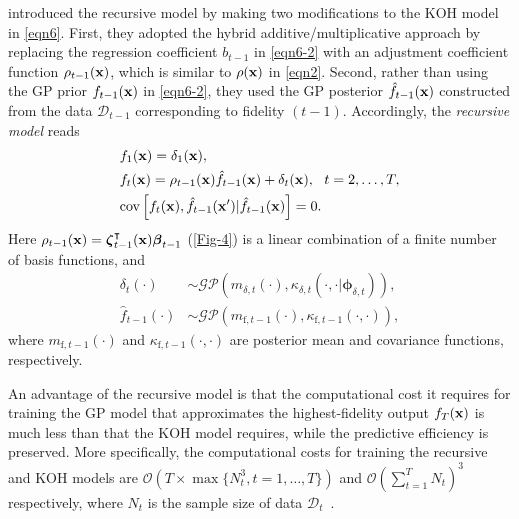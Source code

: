 \documentclass[journal ]{new-aiaa}
\begin{document}
	\citet{Gratiet2014} introduced the recursive model by making two modifications to the KOH model in \cref{eqn6}.
	First, they adopted the hybrid additive/multiplicative approach by replacing the regression coefficient $b_{t-1}$ in \cref{eqn6-2} with an adjustment coefficient function $\rho_{t-1}({\bf x})$, which is similar to $\rho({\bf x})$ in \cref{eqn2}.
	Second, rather than using the GP prior $f_{t-1}({\bf x})$ in \cref{eqn6-2}, they used the GP posterior $\hat{f}_{t-1}({\bf x})$ constructed from the data $\mathcal{D}_{t-1}$ corresponding to fidelity $(t-1)$.
	Accordingly, the \textit{recursive model} reads
	\begin{subequations}\label{eqn14}
		\begin{align}
			& f_1({\bf x}) = \delta_1({\bf x}), \label{eqn14-1}\\
			& f_t({\bf x}) =
			\rho_{t-1}({\bf x}) \hat{f}_{t-1}({\bf x}) + \delta_{t}({\bf x}), \ \ t=2,\dots,T \label{eqn14-2},\\
			&\text{cov}\left[f_{t}({\bf x}),\hat{f}_{t-1}({\bf x}')|\hat{f}_{t-1}({\bf x})\right]=0 
			\label{eqn14-3}.
		\end{align}
	\end{subequations}
	Here $\rho_{t-1}({\bf x}) = {\boldsymbol \zeta}_{t-1}^\intercal({\bf x}) {\boldsymbol \beta}_{t-1}$ (\cref{Fig-4}) is a linear combination of a finite number of basis functions, and
	\begin{subequations}\label{eqn15}
		\begin{align}
			\delta_{t}(\cdot) & \sim \mathcal{GP}\left(m_{\delta,t}(\cdot),\kappa_{\delta,t}(\cdot,\cdot|{\boldsymbol \phi}_{\delta,t})\right)
			\label{eqn15-1},\\
			\hat{f}_{t-1}(\cdot) & \sim \mathcal{GP}\left(m_{\text{f},t-1}(\cdot),\kappa_{\text{f},t-1}(\cdot,\cdot)\right) 
			\label{eqn15-2},
		\end{align}
	\end{subequations}
	where $m_{\text{f},t-1}(\cdot)$ and $\kappa_{\text{f},t-1}(\cdot,\cdot)$ are posterior mean and covariance functions, respectively.
	
	An advantage of the recursive model is that the computational cost it requires for training the GP model that approximates the highest-fidelity output $f_T({\bf x})$ is much less than that the KOH model requires, while the predictive efficiency is preserved.
	More specifically, the computational costs for training the recursive and KOH models are $\mathcal{O}\left(T \times \max\{N_t^3,t=1,\dots,T\}\right)$ and $\mathcal{O}(\sum_{t=1}^T N_t)^3$ respectively, where $N_t$ is the sample size of data $\mathcal{D}_t$~\citep{Gratiet2014}. 
	
\end{document}
